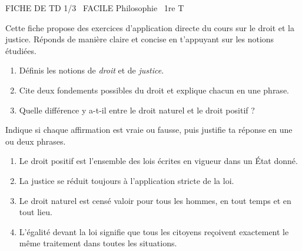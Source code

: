 \documentclass[11pt]{article}
\begin{document}
\begin{tcolorbox}[enhanced,colback=popink,colframe=popink,arc=10pt,boxrule=0pt,left=12pt,right=12pt,top=9pt,bottom=9pt]
{\color{white}\popxbold\small FICHE DE TD 1/3 \textbullet\ FACILE \hfill Philosophie \textbullet\ 1re T\par}
\end{tcolorbox}
\vspace{4pt}
Cette fiche propose des exercices d'application directe du cours sur le droit et la justice. Réponds de manière claire et concise en t'appuyant sur les notions étudiées.

\begin{exercice}
\begin{enumerate}
  \item Définis les notions de \emph{droit} et de \emph{justice}.
  \item Cite deux fondements possibles du droit et explique chacun en une phrase.
  \item Quelle différence y a-t-il entre le droit naturel et le droit positif ?
\end{enumerate}
\end{exercice}

\begin{exercice}
Indique si chaque affirmation est vraie ou fausse, puis justifie ta réponse en une ou deux phrases.
\begin{enumerate}
  \item Le droit positif est l'ensemble des lois écrites en vigueur dans un État donné.
  \item La justice se réduit toujours à l'application stricte de la loi.
  \item Le droit naturel est censé valoir pour tous les hommes, en tout temps et en tout lieu.
  \item L'égalité devant la loi signifie que tous les citoyens reçoivent exactement le même traitement dans toutes les situations.
\end{enumerate}
\end{exercice}
\end{document}
